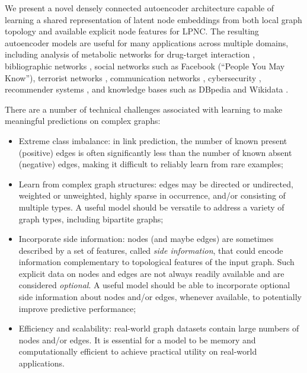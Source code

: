 \documentclass[letterpaper, conference]{IEEEtran}  %
\begin{document}
We present a novel densely connected autoencoder architecture capable of learning a shared representation of latent node embeddings from both local graph topology and available explicit node features for LPNC. The resulting autoencoder models are useful for many applications across multiple domains, including analysis of metabolic networks for drug-target interaction \cite{fakhraei:2014}, bibliographic networks \cite{Sen:2008}, social networks such as Facebook (``People You May Know''), terrorist networks \cite{Zhao:2006}, communication networks \cite{Huang:2009}, cybersecurity \cite{fakhraei:2015}, recommender systems \cite{Koren:2009}, and knowledge bases such as DBpedia and Wikidata \cite{Yang:2015}.

There are a number of technical challenges associated with learning to make meaningful predictions on complex graphs:

\begin{itemize}
\item Extreme class imbalance: in link prediction, the number of known present (positive) edges is often significantly less than the number of known absent (negative) edges, making it difficult to reliably learn from rare examples;
\item Learn from complex graph structures: edges may be directed or undirected, weighted or unweighted, highly sparse in occurrence, and/or consisting of multiple types. A useful model should be versatile to address a variety of graph types, including bipartite graphs;
\item Incorporate side information: nodes (and maybe edges) are sometimes described by a set of features, called \emph{side information}, that could encode information complementary to topological features of the input graph. Such explicit data on nodes and edges are not always readily available and are considered \emph{optional}. A useful model should be able to incorporate optional side information about nodes and/or edges, whenever available, to potentially improve predictive performance;
\item Efficiency and scalability: real-world graph datasets contain large numbers of nodes and/or edges. It is essential for a model to be memory and computationally efficient to achieve practical utility on real-world applications.
\end{itemize}
\end{document}

